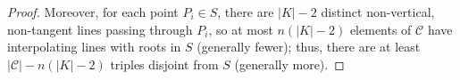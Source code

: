 \documentclass[11pt,letterpaper]{article}
\newcommand{\rigo}[1]{{\textcolor{blue}{#1}}}
\theoremstyle{definition}
\newcommand{\6}{\mathbf}
\newcommand{\7}{\mathcal}
\begin{document}
\begin{proof}
Moreover, for each point $P_i \in S$, there are $\left|K\right|-2$ distinct non-vertical, non-tangent lines passing through $P_i$, so at most $n(\left|K\right|-2)$ elements of $\mathcal{C}$ have interpolating lines with roots in $S$ (generally fewer); thus, there are at least $\left|\mathcal{C}\right| - n(\left|K\right|-2)$ triples disjoint from $S$ (generally more).
\end{proof}
\end{document}
